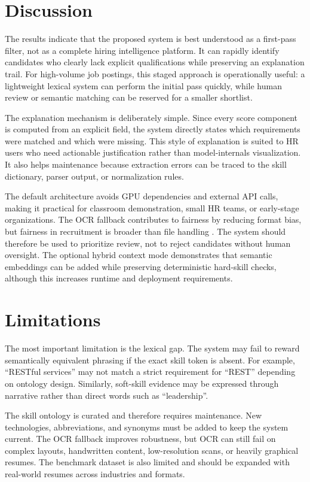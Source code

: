 \section{Discussion}
The results indicate that the proposed system is best understood as a first-pass filter, not as a complete hiring intelligence platform. It can rapidly identify candidates who clearly lack explicit qualifications while preserving an explanation trail. For high-volume job postings, this staged approach is operationally useful: a lightweight lexical system can perform the initial pass quickly, while human review or semantic matching can be reserved for a smaller shortlist.

The explanation mechanism is deliberately simple. Since every score component is computed from an explicit field, the system directly states which requirements were matched and which were missing. This style of explanation is suited to HR users who need actionable justification rather than model-internals visualization. It also helps maintenance because extraction errors can be traced to the skill dictionary, parser output, or normalization rules.

The default architecture avoids GPU dependencies and external API calls, making it practical for classroom demonstration, small HR teams, or early-stage organizations. The OCR fallback contributes to fairness by reducing format bias, but fairness in recruitment is broader than file handling \cite{b4}. The system should therefore be used to prioritize review, not to reject candidates without human oversight. The optional hybrid context mode demonstrates that semantic embeddings can be added while preserving deterministic hard-skill checks, although this increases runtime and deployment requirements.

\section{Limitations}
The most important limitation is the lexical gap. The system may fail to reward semantically equivalent phrasing if the exact skill token is absent. For example, ``RESTful services'' may not match a strict requirement for ``REST'' depending on ontology design. Similarly, soft-skill evidence may be expressed through narrative rather than direct words such as ``leadership''.

The skill ontology is curated and therefore requires maintenance. New technologies, abbreviations, and synonyms must be added to keep the system current. The OCR fallback improves robustness, but OCR can still fail on complex layouts, handwritten content, low-resolution scans, or heavily graphical resumes. The benchmark dataset is also limited and should be expanded with real-world resumes across industries and formats.

